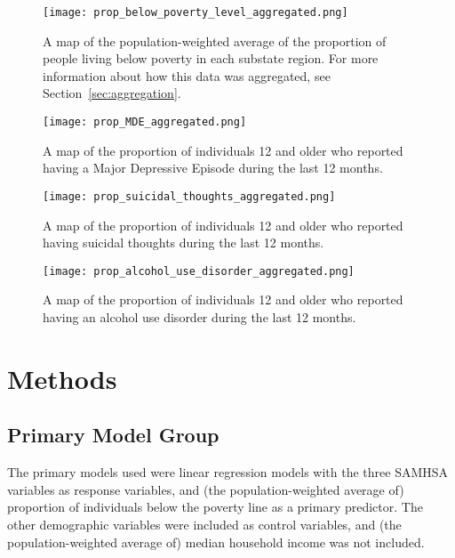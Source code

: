 \documentclass{article}
\begin{document}

\begin{figure}[!htb]
    \centering
    \texttt{[image: prop\_below\_poverty\_level\_aggregated.png]}
    \caption{A map of the population-weighted average of the proportion of
    people living below poverty in each substate region.
	For more information about how this data was aggregated,
	see Section~\ref{sec:aggregation}.
	}
    \label{fig:map-poverty}
\end{figure}

\begin{figure}[!htb]
    \centering
    \texttt{[image: prop\_MDE\_aggregated.png]}
    \caption{A map of the proportion of individuals 12 and older who
	reported having a Major Depressive Episode during the last 12 months.}
    \label{fig:map-MDE}
\end{figure}

\begin{figure}[!htb]
    \centering
    \texttt{[image: prop\_suicidal\_thoughts\_aggregated.png]}
    \caption{A map of the proportion of individuals 12 and older who
	reported having suicidal thoughts during the last 12 months.}
    \label{fig:map-suicidal-thoughts}
\end{figure}

\begin{figure}[!htb]
    \centering
    \texttt{[image: prop\_alcohol\_use\_disorder\_aggregated.png]}
    \caption{A map of the proportion of individuals 12 and older who
	reported having an alcohol use disorder during the last 12 months.}
    \label{fig:map-alcohol-use}
\end{figure}


\section{Methods}

\subsection{Primary Model Group}

The primary models used were linear regression models with the three SAMHSA
variables as response variables, and
(the population-weighted average of)
proportion of individuals below the poverty line as a primary predictor.
The other demographic variables were included as control variables,
and
(the population-weighted average of)
median household income was not included.
\end{document}
